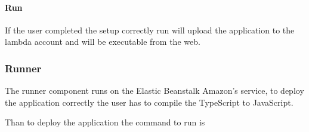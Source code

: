 \paragraph{Run}
If the user completed the setup correctly run  will upload the application to the lambda account and will be executable from the web.
\subsubsection{Runner}
The runner component runs on the Elastic Beanstalk Amazon's service, to deploy the application correctly the user has to compile the TypeScript to JavaScript.
\begin{center}
\end{center}

Than to deploy the application the command to run is 